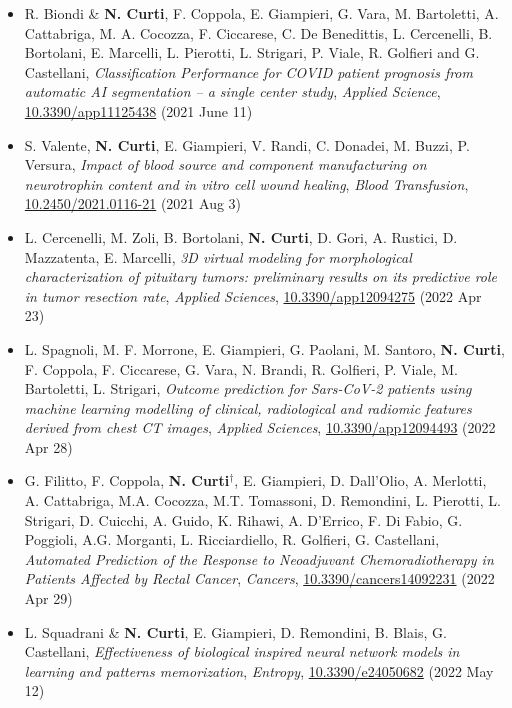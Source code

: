 \documentclass[a4paper,11pt]{article}
\newcommand{\itemicon}[2]{\item[{\texttt{[image: \#2]}}]}
\begin{document}
\begin{itemize}
  \itemicon{0.05}{article.png} R. Biondi \& \textbf{N. Curti}, F. Coppola, E. Giampieri, G. Vara, M. Bartoletti, A. Cattabriga, M. A. Cocozza, F. Ciccarese, C. De Benedittis, L. Cercenelli, B. Bortolani, E. Marcelli, L. Pierotti, L. Strigari, P. Viale, R. Golfieri and G. Castellani, \emph{Classification Performance for COVID patient prognosis from automatic AI segmentation – a single center study}, \emph{Applied Science}, \url{10.3390/app11125438} (2021 June 11)

  \itemicon{0.05}{article.png} S. Valente, \textbf{N. Curti}, E. Giampieri, V. Randi, C. Donadei, M. Buzzi, P. Versura, \emph{Impact of blood source and component manufacturing on neurotrophin content and in vitro cell wound healing}, \emph{Blood Transfusion}, \url{10.2450/2021.0116-21} (2021 Aug 3)

  \itemicon{0.05}{article.png} L. Cercenelli, M. Zoli, B. Bortolani, \textbf{N. Curti}, D. Gori, A. Rustici, D. Mazzatenta, E. Marcelli, \emph{3D virtual modeling for morphological characterization of pituitary tumors: preliminary results on its predictive role in tumor resection rate}, \emph{Applied Sciences}, \url{10.3390/app12094275} (2022 Apr 23)

  \itemicon{0.05}{article.png} L. Spagnoli, M. F. Morrone, E. Giampieri, G. Paolani, M. Santoro, \textbf{N. Curti}, F. Coppola, F. Ciccarese, G. Vara, N. Brandi, R. Golfieri, P. Viale, M. Bartoletti, L. Strigari, \emph{Outcome prediction for Sars-CoV-2 patients using machine learning modelling of clinical, radiological and radiomic features derived from chest CT images}, \emph{Applied Sciences}, \url{10.3390/app12094493} (2022 Apr 28)

  \itemicon{0.05}{article.png} G. Filitto, F. Coppola, \textbf{N. Curti$^\dagger$}, E. Giampieri, D. Dall’Olio, A. Merlotti, A. Cattabriga, M.A. Cocozza, M.T. Tomassoni, D. Remondini, L. Pierotti, L. Strigari, D. Cuicchi, A. Guido, K. Rihawi, A. D'Errico, F. Di Fabio, G. Poggioli, A.G. Morganti, L. Ricciardiello, R. Golfieri, G. Castellani, \emph{Automated Prediction of the Response to Neoadjuvant Chemoradiotherapy in Patients Affected by Rectal Cancer}, \emph{Cancers}, \url{10.3390/cancers14092231} (2022 Apr 29)

  \itemicon{0.05}{article.png} L. Squadrani \& \textbf{N. Curti}, E. Giampieri, D. Remondini, B. Blais, G. Castellani, \emph{Effectiveness of biological inspired neural network models in learning and patterns memorization}, \emph{Entropy}, \url{10.3390/e24050682} (2022 May 12)


\end{itemize}
\end{document}
